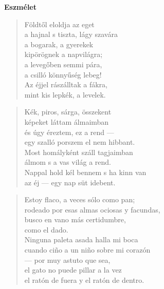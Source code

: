 \newpage

\vspace*{-15mm}
\centeredornament
\vspace*{2mm}


\begin{center}
  \textbf{\large Eszmélet}
\end{center}


\begin{verse}
  Földtől eloldja az eget \\
  a hajnal s tiszta, lágy szavára \\
  a bogarak, a gyerekek \\
  kipörögnek a napvilágra; \\
  a levegőben semmi pára, \\
  a csilló könnyűség lebeg! \\
  Az éjjel rászálltak a fákra, \\
  mint kis lepkék, a levelek.
\end{verse}

\bigskip


\begin{verse}
  Kék, piros, sárga, összekent \\
  képeket láttam álmaimban \\
  és úgy éreztem, ez a rend --- \\
  egy szalló porszem el nem hibbant. \\
  Most homályként száll tagjaimban \\
  álmom s a vas világ a rend. \\
  Nappal hold kél bennem s ha kinn van \\
  az éj --- egy nap süt idebent.
\end{verse}

\newpage

\vspace*{-15mm}
\centeredornament




\begin{verse}
  Estoy flaco, a veces sólo como pan; \\
  rodeado por esas almas ociosas y facundas, \\
  busco en vano más certidumbre, \\
  como el dado. \\
  Ninguna paleta asada halla mi boca \\
  cuando ciño a un niño sobre mi corazón \\
  --- por muy astuto que sea, \\
  el gato no puede pillar a la vez \\
  el ratón de fuera y el ratón de dentro.
\end{verse}

